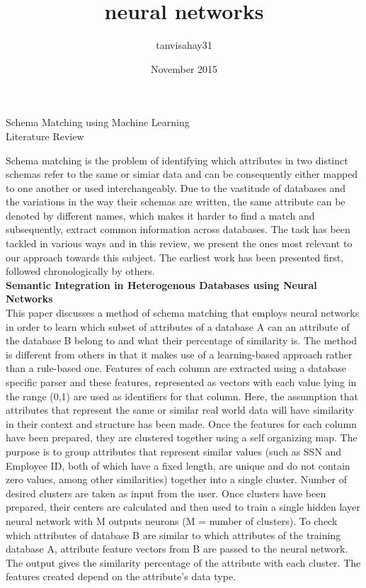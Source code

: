 \documentclass{article}
\title{neural networks}
\author{tanvisahay31 }
\date{November 2015}
\begin{document}
\begin{center}
\large{Schema Matching using Machine Learning}\\
\vspace{0.6em}
\large{Literature Review}
\end{center}
\vspace{1em}
\noindent
Schema matching is the problem of identifying which attributes in two distinct schemas refer to the same or simiar data and can be consequently either mapped to one another or used interchangeably. Due to the vastitude of databases and the variations in the way their schemas are written, the same attribute can be denoted by different names, which makes it harder to find a match and subsequently, extract common information across databases. The task has been tackled in various ways and in this review, we present the ones most relevant to our approach towards this subject. The earliest work has been presented first, followed chronologically by others.\\

\noindent
\textbf{Semantic Integration in Heterogenous Databases using Neural Networks
}\cite{ref2}\\
\noindent
This paper discusses a method of schema matching that employs neural networks in order to learn which subset of attributes of a database A can an attribute of the database B belong to and what their percentage of similarity is. The method is different from others in that it makes use of a learning-based approach rather than a rule-based one. Features of each column are extracted using a database specific parser and these features, represented as vectors with each value lying in the range (0,1) are used as identifiers for that column. Here, the assumption that attributes that represent the same or similar real world data will have similarity in their context and structure has been made. Once the features for each column have been prepared, they are clustered together using a self organizing map. The purpose is to group attributes that represent similar values (such as SSN and Employee ID, both of which have a fixed length, are unique and do not contain zero values, among other similarities) together into a single cluster. Number of desired clusters are taken as input from the user. Once clusters have been prepared, their centers are calculated and then used to train a single hidden layer neural network with M outputs neurons (M = number of clusters). To check which attributes of database B are similar to which attributes of the training database A, attribute feature vectors from B are passed to the neural network. The output gives the similarity percentage of the attribute with each cluster. The features created depend on the attribute's data type. 
\end{document}
